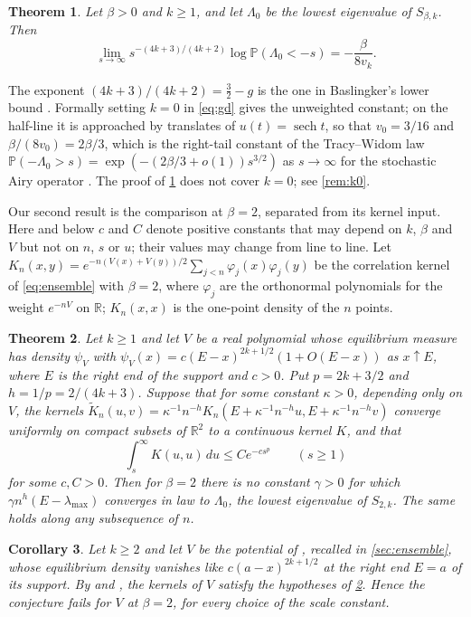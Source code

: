 \documentclass[11pt]{article}
\newtheorem{theorem}{Theorem}[section]
\newtheorem{corollary}[theorem]{Corollary}
\theoremstyle{remark}
\newcommand{\Prob}{\mathbb{P}}
\newcommand{\R}{\mathbb{R}}
\begin{document}
\begin{theorem}\label{thm:tail}
Let $\beta>0$ and $k\ge1$, and let $\Lambda_0$ be the lowest eigenvalue of $S_{\beta,k}$. Then
\[
\lim_{s\to\infty}s^{-(4k+3)/(4k+2)}\log\Prob(\Lambda_0<-s)=-\frac{\beta}{8v_k}.
\]
\end{theorem}

The exponent $(4k+3)/(4k+2)=\frac32-g$ is the one in Baslingker's lower bound \cite[(22)]{Bas}. Formally setting
$k=0$ in \eqref{eq:gd} gives the unweighted constant; on the half-line it is approached by translates of $u(t)=\operatorname{sech}t$, so that
$v_0=3/16$ and $\beta/(8v_0)=2\beta/3$, which is the right-tail constant of the Tracy--Widom law
$\Prob(-\Lambda_0>s)=\exp(-(2\beta/3+o(1))s^{3/2})$ as $s\to\infty$ for the stochastic Airy operator \cite{DV,RRV}. The proof of
\cref{thm:tail} does not cover $k=0$; see \cref{rem:k0}.

Our second result is the comparison at $\beta=2$, separated from its kernel input. Here and below $c$ and $C$
denote positive constants that may depend on $k$, $\beta$ and $V$ but not on $n$, $s$ or $u$; their values may
change from line to line. Let $K_n(x,y)=e^{-n(V(x)+V(y))/2}\sum_{j<n}\varphi_j(x)\varphi_j(y)$ be the
correlation kernel of \eqref{eq:ensemble} with $\beta=2$, where $\varphi_j$ are the orthonormal polynomials for the weight
$e^{-nV}$ on $\R$; $K_n(x,x)$ is the one-point density of the $n$ points.

\begin{theorem}\label{thm:counter}
Let $k\ge1$ and let $V$ be a real polynomial whose equilibrium measure has density $\psi_V$ with
$\psi_V(x)=c(E-x)^{2k+1/2}(1+O(E-x))$ as $x\uparrow E$, where $E$ is the right end of the support and $c>0$. Put
$p=2k+3/2$ and $h=1/p=2/(4k+3)$. Suppose that for some constant $\kappa>0$, depending only on $V$, the kernels
$\widetilde K_n(u,v)=\kappa^{-1}n^{-h}K_n(E+\kappa^{-1}n^{-h}u,E+\kappa^{-1}n^{-h}v)$ converge uniformly on compact subsets of
$\R^2$ to a continuous kernel $K$, and that
\begin{equation}\label{eq:H}
\int_s^\infty K(u,u)\,du\le C e^{-cs^{p}}\qquad(s\ge1)
\end{equation}
for some $c,C>0$. Then for $\beta=2$ there is no constant $\gamma>0$ for which $\gamma n^{h}(E-\lambda_{\max})$
converges in law to $\Lambda_0$, the lowest eigenvalue of $S_{2,k}$. The same holds along any subsequence of $n$.
\end{theorem}

\begin{corollary}\label{cor:all-k}
Let $k\ge2$ and let $V$ be the potential of \cite[Remark~1.7]{DDL}, recalled in \cref{sec:ensemble}, whose equilibrium
density vanishes like $c(a-x)^{2k+1/2}$ at the right end $E=a$ of its support. By \cite[Theorem~1.9]{DDL} and
\cite[(1.23)]{CIK}, the kernels of $V$ satisfy the hypotheses of \cref{thm:counter}. Hence the conjecture
\cite[Conjecture~45]{KRVarxiv} fails for $V$ at $\beta=2$, for every choice of the scale constant.
\end{corollary}
\end{document}
